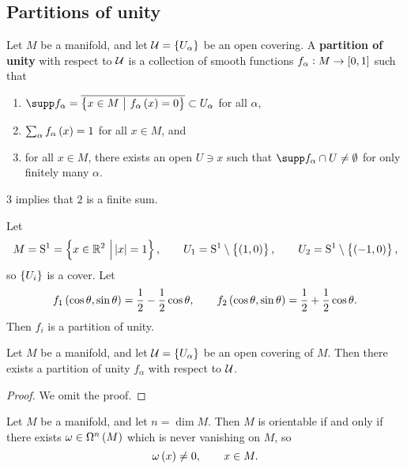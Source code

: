 \pagebreak

\subsection{Partitions of unity}

\begin{definition}
Let $ M $ be a manifold, and let $ \UUU = \cbr{U_\alpha} $ be an open covering. A \textbf{partition of unity} with respect to $ \mathcal{U} $ is a collection of smooth functions $ f_\alpha : M \to \sbr{0, 1} $ such that
\begin{enumerate}
\item $ \supp f_\alpha = \overline{\cbr{x \in M \st f_\alpha\br{x} = 0}} \subset U_\alpha $ for all $ \alpha $,
\item $ \sum_\alpha f_\alpha\br{x} = 1 $ for all $ x \in M $, and
\item for all $ x \in M $, there exists an open $ U \ni x $ such that $ \supp f_\alpha \cap U \ne \emptyset $ for only finitely many $ \alpha $.
\end{enumerate}
\end{definition}

\begin{remark*}
$ 3 $ implies that $ 2 $ is a finite sum.
\end{remark*}

\begin{example}
Let
$$ M = \S^1 = \cbr{x \in \RR^2 \st \abs{x} = 1}, \qquad U_1 = \S^1 \setminus \cbr{\br{1, 0}}, \qquad U_2 = \S^1 \setminus \cbr{\br{-1, 0}}, $$
so $ \cbr{U_i} $ is a cover. Let
$$ f_1\br{\cos \theta, \sin \theta} = \dfrac{1}{2} - \dfrac{1}{2}\cos \theta, \qquad f_2\br{\cos \theta, \sin \theta} = \dfrac{1}{2} + \dfrac{1}{2}\cos \theta. $$
Then $ f_i $ is a partition of unity.
\end{example}

\begin{proposition}
Let $ M $ be a manifold, and let $ \UUU = \cbr{U_\alpha} $ be an open covering of $ M $. Then there exists a partition of unity $ f_\alpha $ with respect to $ \mathcal{U} $.
\end{proposition}

\begin{proof}
We omit the proof.
\end{proof}

\begin{proposition}
\label{prop:1.23}
Let $ M $ be a manifold, and let $ n = \dim M $. Then $ M $ is orientable if and only if there exists $ \omega \in \Omega^n\br{M} $ which is never vanishing on $ M $, so
$$ \omega\br{x} \ne 0, \qquad x \in M. $$
\end{proposition}

